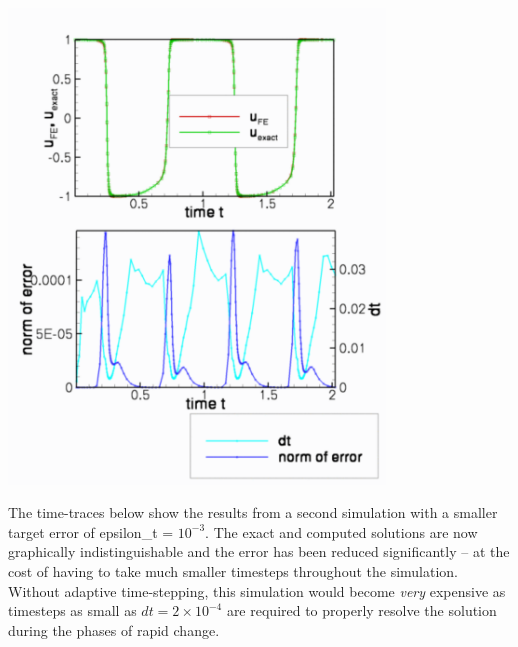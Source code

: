  
\begin{DoxyImage}
\includegraphics[width=0.75\textwidth]{trace}
\end{DoxyImage}


The time-\/traces below show the results from a second simulation with a smaller target error of {\ttfamily epsilon\+\_\+t} = $ 10^{-3} $. The exact and computed solutions are now graphically indistinguishable and the error has been reduced significantly -- at the cost of having to take much smaller timesteps throughout the simulation. Without adaptive time-\/stepping, this simulation would become {\itshape very} expensive as timesteps as small as $ dt = 2 \times 10^{-4}$ are required to properly resolve the solution during the phases of rapid change.

